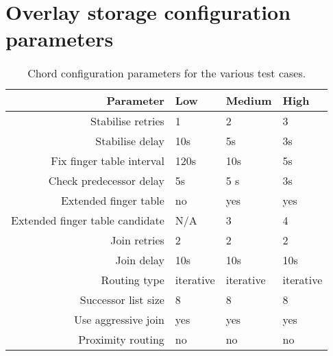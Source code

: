 \chapter{Overlay storage configuration parameters}
\label{chp:OVERLAY_CONFIG}

\begin{table}[phtb]
\centering
\begin{tabular}{|r|l|l|l|}
\hline
Parameter                       & Low  & Medium & High  \\
\hline
Stabilise retries               & 1    & 2      &  3    \\
Stabilise delay                 & 10s  & 5s     &  3s   \\
Fix finger table interval       & 120s & 10s    &  5s   \\
Check predecessor delay         & 5s   & 5 s    &  3s   \\
Extended finger table           & no   & yes    &  yes  \\
Extended finger table candidate & N/A  & 3      &  4    \\
\hline
Join retries                    & 2    & 2      & 2     \\
Join delay                      & 10s  & 10s    & 10s   \\
Routing type                    & iterative & iterative & iterative \\
Successor list size             & 8    & 8      & 8     \\
Use aggressive join             & yes  & yes    & yes   \\
Proximity routing               & no   & no     & no    \\
\hline
\end{tabular}
\caption{Chord configuration parameters for the various test cases.}
\label{tab_chord_configs}
\end{table}

